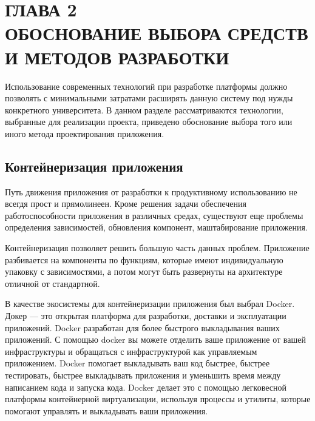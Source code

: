 \section*{ГЛАВА 2\\ ОБОСНОВАНИЕ ВЫБОРА СРЕДСТВ И МЕТОДОВ РАЗРАБОТКИ}
\setcounter{section}{2}\setcounter{subsection}{0}

Использование современных технологий при разработке платформы должно позволять
с минимальными затратами расширять данную систему под нужды конкретного университета.
В данном разделе рассматриваются технологии, выбранные для реализации проекта,
приведено обоснование выбора того или иного метода проектирования приложения.

\subsection{Контейнеризация приложения}

Путь движения приложения от разработки к продуктивному использованию не всегдя прост и
прямолинеен. Кроме решения задачи обеспечения работоспособности приложения в различных
средах, существуют еще проблемы определения зависимостей, обновления компонент,
маштабирование приложения.

Контейнеризация позволяет решить большую часть данных проблем. Приложение разбивается
на компоненты по функциям, которые имеют индивидуальную упаковку с зависимостями,
а потом могут быть развернуты на архитектуре отличной от стандартной.

В качестве экосистемы для контейнеризации приложения был выбрал Docker. Докер — это открытая
платформа для разработки, доставки и эксплуатации приложений. Docker разработан для более
быстрого выкладывания ваших приложений. С помощью docker вы можете отделить ваше приложение
от вашей инфраструктуры и обращаться с инфраструктурой как управляемым приложением.
Docker помогает выкладывать ваш код быстрее, быстрее тестировать, быстрее выкладывать
приложения и уменьшить время между написанием кода и запуска кода. Docker делает
это с помощью легковесной платформы контейнерной виртуализации, используя процессы и
утилиты, которые помогают управлять и выкладывать ваши приложения.

